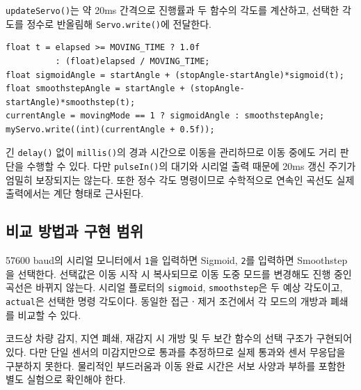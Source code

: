 \documentclass[a4paper,10pt]{article}
\begin{document}
\texttt{updateServo()}는 약 20ms 간격으로 진행률과 두 함수의 각도를 계산하고,
선택한 각도를 정수로 반올림해 \texttt{Servo.write()}에 전달한다.
\begin{lstlisting}
float t = elapsed >= MOVING_TIME ? 1.0f
          : (float)elapsed / MOVING_TIME;
float sigmoidAngle = startAngle + (stopAngle-startAngle)*sigmoid(t);
float smoothstepAngle = startAngle + (stopAngle-startAngle)*smoothstep(t);
currentAngle = movingMode == 1 ? sigmoidAngle : smoothstepAngle;
myServo.write((int)(currentAngle + 0.5f));
\end{lstlisting}
긴 \texttt{delay()} 없이 \texttt{millis()}의 경과 시간으로 이동을 관리하므로 이동 중에도
거리 판단을 수행할 수 있다. 다만 \texttt{pulseIn()}의 대기와 시리얼 출력 때문에
20ms 갱신 주기가 엄밀히 보장되지는 않는다. 또한 정수 각도 명령이므로
수학적으로 연속인 곡선도 실제 출력에서는 계단 형태로 근사된다.

\subsection{비교 방법과 구현 범위}
57600 baud의 시리얼 모니터에서 \texttt{1}을 입력하면 Sigmoid,
\texttt{2}를 입력하면 Smoothstep을 선택한다. 선택값은 이동 시작 시 복사되므로
이동 도중 모드를 변경해도 진행 중인 곡선은 바뀌지 않는다. 시리얼 플로터의
\texttt{sigmoid}, \texttt{smoothstep}은 두 예상 각도이고, \texttt{actual}은 선택한
명령 각도이다. 동일한 접근ㆍ제거 조건에서 각 모드의 개방과 폐쇄를 비교할 수 있다.

코드상 차량 감지, 지연 폐쇄, 재감지 시 개방 및 두 보간 함수의 선택 구조가 구현되어 있다.
다만 단일 센서의 미감지만으로 통과를 추정하므로 실제 통과와 센서 무응답을 구분하지 못한다.
물리적인 부드러움과 이동 완료 시간은 서보 사양과 부하를 포함한 별도 실험으로 확인해야 한다.
\end{document}
